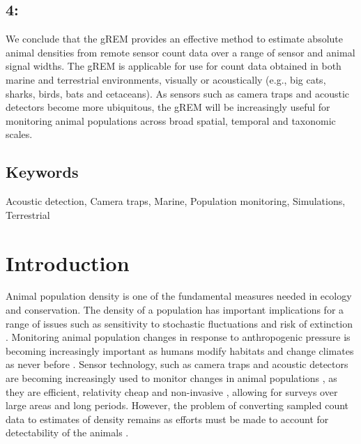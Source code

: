 \documentclass[a4paper,10pt,reqno,oneside]{amsart}
\begin{document}
\subsection*{4:} We conclude that the gREM provides an effective method to estimate absolute animal densities from remote sensor count data over a range of sensor and animal signal widths. The gREM is applicable for use for count data obtained in both marine and terrestrial environments, visually or acoustically (e.g., big cats, sharks, birds, bats and cetaceans). As sensors such as camera traps and acoustic detectors become more ubiquitous, the gREM will be increasingly useful for monitoring animal populations across broad spatial, temporal and taxonomic scales. 

\subsection{Keywords} %
Acoustic detection, Camera traps, Marine, Population monitoring, Simulations, Terrestrial 

\section{Introduction}
Animal population density is one of the fundamental measures needed in ecology and conservation. The density of a population has important implications for a range of issues such as sensitivity to stochastic fluctuations \citep{richter1972extinction, wright1983stochastic} and risk of extinction \citep{purvis2000predicting}. Monitoring animal population changes in response to anthropogenic pressure is becoming increasingly important as humans modify habitats and change climates as never before \citep{everatt2014trophic}. %
Sensor technology, such as camera traps \citep{rowcliffe2008surveys, karanth1995estimating} and acoustic detectors \citep{ofarrel1999comparison, clark1995application, acevedo2006using} are becoming increasingly used to monitor changes in animal populations \citep{rowcliffe2008surveys, kessel2014review}, as they are efficient, relativity cheap and non-invasive \citep{cutler1999using}, allowing for surveys over large areas and long periods. However, the problem of converting sampled count data to estimates of density remains as efforts must be made to account for detectability of the animals \citep{anderson2001need}.
\end{document}
